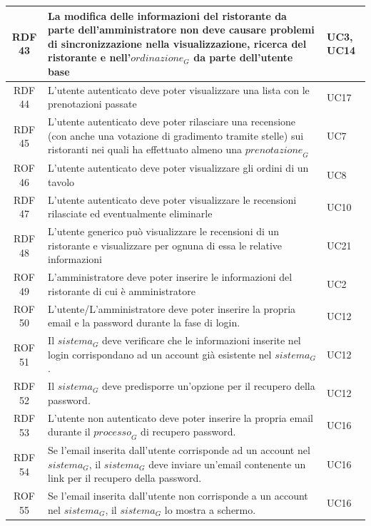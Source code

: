 \documentclass[12pt, oneside]{article}
\begin{document}
\begin{longtable}{|c|p{14cm}|p{2cm}|}
    \hline
    RDF 43& La modifica delle informazioni del ristorante da parte dell'amministratore non deve causare problemi di sincronizzazione nella visualizzazione, ricerca del ristorante e nell'$\textit{ordinazione}_G$ da parte dell'utente base & UC3, UC14 \\
    \hline
    RDF 44& L'utente autenticato deve poter visualizzare una lista con le prenotazioni passate & UC17 \\
    \hline
    RDF 45& L'utente autenticato deve poter rilasciare una recensione (con anche una votazione di gradimento tramite stelle) sui ristoranti nei quali ha effettuato almeno una $\textit{prenotazione}_G$ & UC7 \\
    \hline
    ROF 46& L'utente autenticato deve poter visualizzare gli ordini di un tavolo & UC8 \\
    \hline
    RDF 47& L'utente autenticato deve poter visualizzare le recensioni rilasciate ed eventualmente eliminarle & UC10 \\
    \hline
    RDF 48& L'utente generico può visualizzare le recensioni di un ristorante e visualizzare per ognuna di essa le relative informazioni & UC21 \\
    \hline
    ROF 49& L'amministratore deve poter inserire le informazioni del ristorante di cui è amministratore & UC2 \\
    \hline
    ROF 50& L'utente/L'amministratore deve poter inserire la propria email e la password durante la fase di login.  & UC12 \\
    \hline
    ROF 51& Il $\textit{sistema}_G$ deve verificare che le informazioni inserite nel login corrispondano ad un account già esistente nel $\textit{sistema}_G$.  & UC12 \\
    \hline
    RDF 52& Il $\textit{sistema}_G$ deve predisporre un’opzione per il recupero della password.  & UC12 \\
    \hline
    RDF 53& L’utente non autenticato deve poter inserire la propria email durante il $\textit{processo}_G$ di recupero password.  & UC16 \\
    \hline
    RDF 54 & Se l’email inserita dall’utente corrisponde ad un account nel $\textit{sistema}_G$, il $\textit{sistema}_G$ deve inviare un’email contenente un link per il recupero della password.  & UC16 \\
    \hline
    ROF 55 & Se l'email inserita dall'utente non corrisponde a un account nel $\textit{sistema}_G$, il $\textit{sistema}_G$ lo mostra a schermo.  & UC16 \\

\end{longtable}
\end{document}
